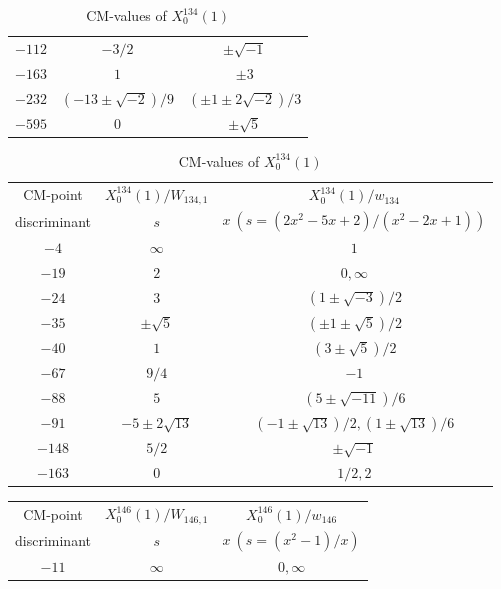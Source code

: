 \documentclass{amsart}
\theoremstyle{definition}
\begin{document}
\begin{appendices}
\begin{table}
\begin{tabular}{|c|c|c|}
${-112}$ & $-{3}/{2}$ & $\pm \sqrt{-1}$   \\ 
${-163}$ & $1$ & $\pm3$   \\ 

${-232}$ & $(-13\pm\sqrt{-2})/{9}$ & $(\pm 1\pm 2\sqrt{-2})/{3}$ 
\\ 
${-595}$ & $0$ & $\pm \sqrt{5}$   \\ \hline



\end{tabular}
\bigskip
\caption{CM-values of $X^{119}_0(1)$}


\renewcommand{\arraystretch}{1.5}
\tabcolsep=10pt                         
\begin{tabular}{|c|c|c|}
\hline
CM-point& ${X_{0}^{134}(1)/W_{134,1}}$ & ${X_{0}^{134}(1)/w_{134}}$ \\ 
discriminant & $s$ & $x\ (s=(2x^2-5x+2)/(x^2-2x+1))$  \\ \hline
${-4}$ & $\infty $ & $1 $ \\ 

${-19}$ & $2$ & $0,\infty$   \\ 
${-24}$ & $3$ & $(1\pm\sqrt{-3})/{2}$   \\ 
${-35}$ & $\pm \sqrt{5}$ & $(\pm 1\pm\sqrt{5})/{2}$  \\ 
${-40}$ & $1$ & $(3\pm\sqrt{5})/{2}$   \\ 
${-67}$ & ${9}/{4}$ & $-1$  \\
${-88}$ & $5$ & $(5\pm\sqrt{-11})/{6}$ \\ 
${-91}$ & $-5\pm 2\sqrt{13}$ & $(- 1\pm\sqrt{13})/{2},({1\pm\sqrt{13}})/{6}$  \\ 
${-148}$ & ${5}/{2}$ & $\pm \sqrt{-1}$  \\ 
${-163}$ & $0$ & ${1}/{2},2$ \\ \hline
\end{tabular}

\bigskip
\caption{CM-values of $X^{134}_0(1)$}
\end{table}

\renewcommand{\arraystretch}{1.5}
\tabcolsep=10pt                         
\begin{table}
\begin{tabular}{|c|c|c|}
\hline
CM-point& ${X_{0}^{146}(1)/W_{146,1}}$ & ${X_{0}^{146}(1)/w_{146}}$  \\ 
discriminant & $s$ & $x\ (s=(x^2-1)/{x})$   \\ \hline
${-11}$ & $\infty $ & $0,\infty$  \\ 


\end{tabular}
\end{table}
\end{appendices}
\end{document}
